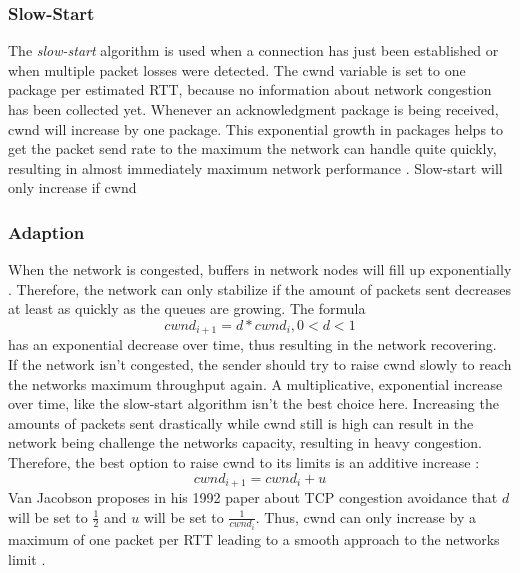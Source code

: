\documentclass[a4paper,conference]{IEEEtran}
\begin{document}
\subsubsection*{Slow-Start}
The \textit{slow-start} algorithm is used when a connection has just been established or when multiple packet losses were detected. The cwnd variable is set to one package per estimated RTT, because no information about network congestion has been collected yet. Whenever an acknowledgment package is being received, cwnd will increase by one package. This exponential growth in packages helps to get the packet send rate to the maximum the network can handle quite quickly, resulting in almost immediately maximum network performance \cite{jacobson1992tcp}. Slow-start will only increase if cwnd

\subsubsection*{Adaption}
When the network is congested, buffers in network nodes will fill up exponentially \cite{jacobson1992tcp}. Therefore, the network can only stabilize if the amount of packets sent decreases at least as quickly as the queues are growing. The formula \cite{jacobson1992tcp} \[cwnd_{i+1}=d*cwnd_{i}, 0<d<1\] has an exponential decrease over time, thus resulting in the network recovering.\\
If the network isn't congested, the sender should try to raise cwnd slowly to reach the networks maximum throughput again. A multiplicative, exponential increase over time, like the slow-start algorithm isn't the best choice here. Increasing the amounts of packets sent drastically while cwnd still is high can result in the network being challenge the networks capacity, resulting in heavy congestion. Therefore, the best option to raise cwnd to its limits is an additive increase \cite{jacobson1992tcp}:\[cwnd_{i+1}=cwnd_{i} + u\] Van Jacobson proposes in his 1992 paper about TCP congestion avoidance that $d$ will be set to $\frac{1}{2}$ and $u$ will be set to $\frac{1}{cwnd_{i}}$. Thus, cwnd can only increase by a maximum of one packet per RTT leading to a smooth approach to the networks limit \cite{jacobson1992tcp}.
\end{document}
